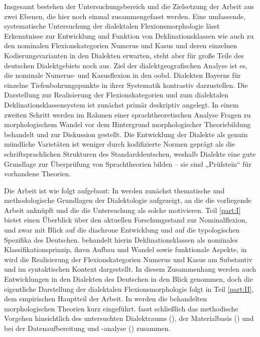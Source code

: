 Insgesamt bestehen der Untersuchungsbereich und die Zielsetzung der Arbeit aus zwei Ebenen, die hier noch einmal zusammengefasst werden. Eine umfassende, systematische Untersuchung der dialektalen Flexionsmorphologie lässt Erkenntnisse zur Entwicklung und Funktion von Deklinationsklassen wie auch zu den nominalen Flexionskategorien Numerus und Kasus und deren einzelnen Kodierungsvarianten in den Dialekten erwarten, steht aber für große Teile des deutschen Dialektgebiets noch aus. Ziel der dialektgeografischen Analyse ist es, die nominale Numerus- und Kasusflexion in den oobd. Dialekten Bayerns für einzelne Tiefenbohrungspunkte in ihrer Systematik kontrastiv darzustellen. Die Darstellung zur Realisierung der Flexionskategorien und zum dialektalen Deklinationsklassensystem ist zunächst primär deskriptiv angelegt. In einem zweiten Schritt werden im Rahmen einer sprachtheoretischen Analyse Fragen zu morphologischem Wandel vor dem Hintergrund morphologischer Theoriebildung behandelt und zur Diskussion gestellt. Die Entwicklung der Dialekte als genuin mündliche Varietäten ist weniger durch kodifizierte Normen geprägt als die schriftsprachlichen Strukturen des Standarddeutschen, weshalb Dialekte eine gute Grundlage zur Überprüfung von Sprachtheorien bilden -- sie sind „Prüfstein“ \citep[368]{Harnisch2000} für vorhandene Theorien.

Die Arbeit ist wie folgt aufgebaut: In  werden zunächst thematische und methodologische Grundlagen der Dialektologie aufgezeigt, an die die vorliegende Arbeit anknüpft und die die Untersuchung als solche motivieren. Teil \ref{part:I} bietet einen Überblick über den aktuellen Forschungsstand zur Nominalflexion, und zwar mit Blick auf die diachrone Entwicklung und auf die typologischen Spezifika des Deutschen.  behandelt hierin Deklinationsklassen als nominales Klassifikationsprinzip, ihren Aufbau und Wandel sowie funktionale Aspekte, in  wird die Realisierung der Flexionskategorien Numerus und Kasus am Substantiv und im syntaktischen Kontext dargestellt. In diesem Zusammenhang werden auch Entwicklungen in den Dialekten des Deutschen in den Blick genommen, doch die eigentliche Darstellung der dialektalen Flexionsmorphologie folgt in Teil \ref{part:II}, dem empirischen Hauptteil der Arbeit. In  werden die behandelten morphologischen Theorien kurz eingeführt.  fasst schließlich das methodische Vorgehen hinsichtlich des untersuchten Dialektraums (), der Materialbasis () und bei der Datenaufbereitung und -analyse () zusammen.\largerpage

